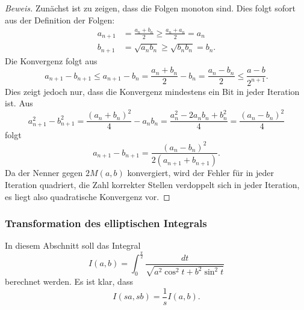\begin{proof}[Beweis]
Zunächst ist zu zeigen, dass die Folgen monoton sind.
Dies folgt sofort aus der Definition der Folgen:
\begin{align*}
a_{n+1} &= \frac{a_n+b_n}{2} \ge \frac{a_n+a_n}{2} = a_n
\\
b_{n+1} &= \sqrt{a_nb_n} \ge \sqrt{b_nb_n} = b_n.
\end{align*}
Die Konvergenz folgt aus
\[
a_{n+1}-b_{n+1}
\le
a_{n+1}-b_n
=
\frac{a_n+b_n}{2}-b_n
=
\frac{a_n-b_n}2
\le
\frac{a-b}{2^{n+1}}.
\]
Dies zeigt jedoch nur, dass die Konvergenz mindestens ein
Bit in jeder Iteration ist.
Aus
\[
a_{n+1}^2 - b_{n+1}^2
=
\frac{(a_n+b_n)^2}{4} - a_nb_n
=
\frac{a_n^2 -2a_nb_n+b_n^2}{4}
=
\frac{(a_n-b_n)^2}{4}
\]
folgt
\[
a_{n+1}-b_{n+1}
=
\frac{(a_n-b_n)^2}{2(a_{n+1}+b_{n+1})}.
\]
Da der Nenner gegen $2M(a,b)$ konvergiert, wird der Fehler für in
jeder Iteration quadriert, die Zahl korrekter Stellen verdoppelt sich
in jeder Iteration, es liegt also quadratische Konvergenz vor.
\end{proof}

%
%
\subsubsection{Transformation des elliptischen Integrals}
In diesem Abschnitt soll das Integral
\[
I(a,b)
=
\int_0^{\frac{\pi}2}
\frac{dt}{\sqrt{a^2\cos^2 t + b^2\sin^2t}}
\]
berechnet werden.
Es ist klar, dass
\[
I(sa,sb)
=
\frac{1}{s} I(a,b).
\]

